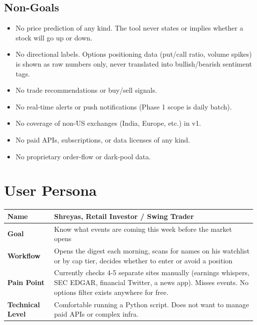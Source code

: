 \documentclass[11pt]{article}
\begin{document}
\subsection{Non-Goals}
\begin{itemize}
  \item No price prediction of any kind. The tool never states or implies whether a stock will go up or down.
  \item No directional labels. Options positioning data (put/call ratio, volume spikes) is shown as raw numbers only, never translated into bullish/bearish sentiment tags.
  \item No trade recommendations or buy/sell signals.
  \item No real-time alerts or push notifications (Phase 1 scope is daily batch).
  \item No coverage of non-US exchanges (India, Europe, etc.) in v1.
  \item No paid APIs, subscriptions, or data licenses of any kind.
  \item No proprietary order-flow or dark-pool data.
\end{itemize}

\section{User Persona}

\begin{tabularx}{\textwidth}{|L{3.2cm}|X|}
\hline
\textbf{Name} & Shreyas, Retail Investor / Swing Trader \\
\hline
\textbf{Goal} & Know what events are coming this week before the market opens \\
\hline
\textbf{Workflow} & Opens the digest each morning, scans for names on his watchlist or by cap tier, decides whether to enter or avoid a position \\
\hline
\textbf{Pain Point} & Currently checks 4-5 separate sites manually (earnings whispers, SEC EDGAR, financial Twitter, a news app). Misses events. No options filter exists anywhere for free. \\
\hline
\textbf{Technical Level} & Comfortable running a Python script. Does not want to manage paid APIs or complex infra. \\
\hline
\end{tabularx}

\end{document}
